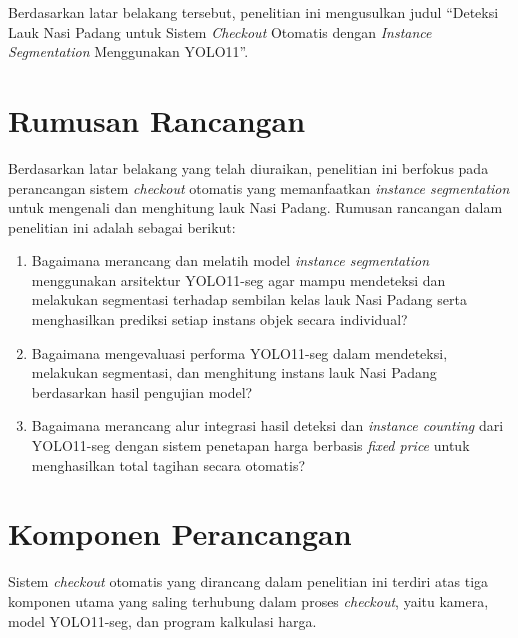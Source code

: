 Berdasarkan latar belakang tersebut, penelitian ini mengusulkan judul ``Deteksi Lauk Nasi Padang untuk Sistem \textit{Checkout} Otomatis dengan \textit{Instance Segmentation} Menggunakan YOLO11''.


\section{Rumusan Rancangan}

Berdasarkan latar belakang yang telah diuraikan, penelitian ini berfokus pada perancangan sistem \textit{checkout} otomatis yang memanfaatkan \textit{instance segmentation} untuk mengenali dan menghitung lauk Nasi Padang. Rumusan rancangan dalam penelitian ini adalah sebagai berikut:

\begin{enumerate}
    \item Bagaimana merancang dan melatih model \textit{instance segmentation} menggunakan arsitektur YOLO11-seg agar mampu mendeteksi dan melakukan segmentasi terhadap sembilan kelas lauk Nasi Padang serta menghasilkan prediksi setiap instans objek secara individual?

    \item Bagaimana mengevaluasi performa YOLO11-seg dalam mendeteksi, melakukan segmentasi, dan menghitung instans lauk Nasi Padang berdasarkan hasil pengujian model?

    \item Bagaimana merancang alur integrasi hasil deteksi dan \textit{instance counting} dari YOLO11-seg dengan sistem penetapan harga berbasis \textit{fixed price} untuk menghasilkan total tagihan secara otomatis?
\end{enumerate}


\section{Komponen Perancangan}

Sistem \textit{checkout} otomatis yang dirancang dalam penelitian ini terdiri atas tiga komponen utama yang saling terhubung dalam proses \textit{checkout}, yaitu kamera, model YOLO11-seg, dan program kalkulasi harga.

